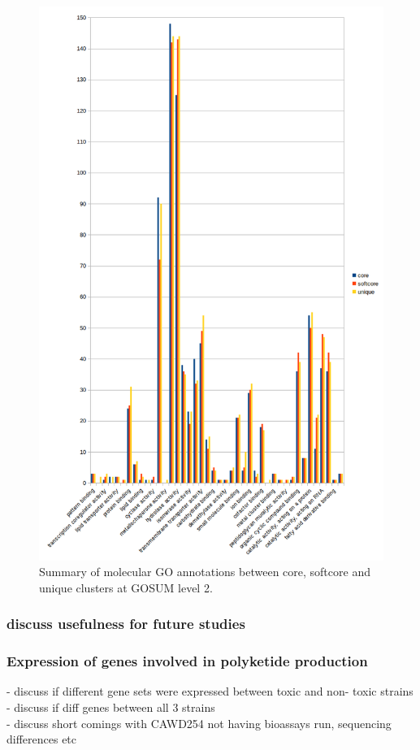 \documentclass[12pt]{article}
\begin{document}
\begin{figure} 
\includegraphics[scale=.75]{3Aug18_cluster-investigation/figures/Gambi-gosum2-molec-graph.png} 
\caption{Summary of molecular GO annotations between core, softcore and unique clusters at GOSUM level 2.} 
\label{fig:}
\end{figure} 
\FloatBarrier

\subsubsection*{discuss usefulness for future studies}

\subsubsection*{Expression of genes involved in polyketide production}
- discuss if different gene sets were expressed between toxic and non- toxic strains\\
- discuss if diff genes between all 3 strains\\
- discuss short comings with CAWD254 not having bioassays run, sequencing differences etc
\end{document}
